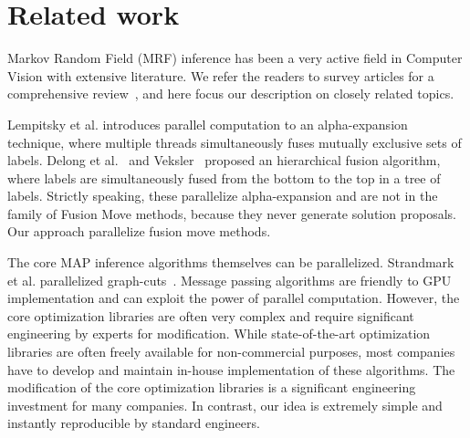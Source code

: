 \section{Related work}


Markov Random Field (MRF) inference has been a very active field in
Computer Vision with extensive literature. We refer the readers to
survey articles for a comprehensive
review~\cite{middlebury_mrf,comparative_study_of_modern_inference}, and
here focus our description on closely related topics.


\noindent Lempitsky et al. introduces parallel computation to an
alpha-expansion technique, where multiple threads simultaneously fuses
mutually exclusive sets of labels. Delong et al.~\cite{delong} and
Veksler~\cite{olga} proposed an hierarchical fusion algorithm, where
labels are simultaneously fused from the bottom to the top in a tree of
labels. Strictly speaking, these parallelize alpha-expansion and are not
in the family of Fusion Move methods, because they never generate
solution proposals. Our approach parallelize fusion move methods.



\noindent
The core MAP inference algorithms themselves can be parallelized.
Strandmark et al. parallelized graph-cuts~\cite{strandmark2010parallel}.
%
Message passing algorithms are friendly to GPU implementation and can
exploit the power of parallel computation.
%
However, the core optimization libraries are often very complex and
require significant engineering by experts for modification.
%
While state-of-the-art optimization libraries are often freely available
for non-commercial purposes, most companies have to develop and maintain
in-house implementation of these algorithms. The modification of the
core optimization libraries is a significant engineering investment for
many companies. In contrast, our idea is extremely simple and instantly
reproducible by standard engineers.






